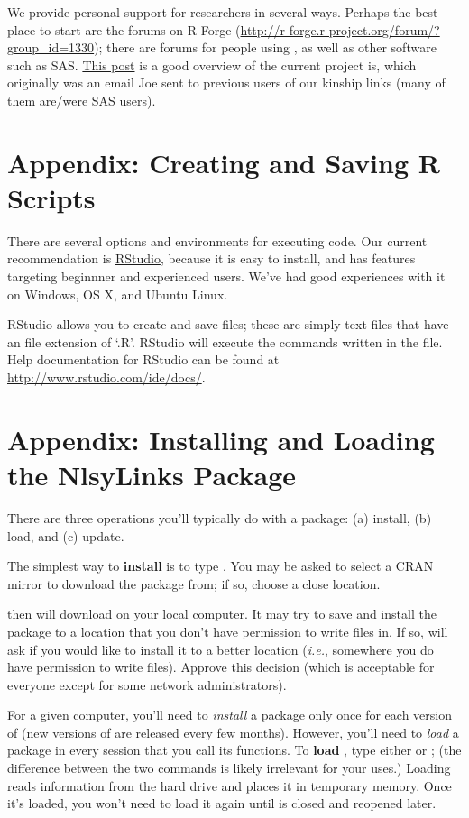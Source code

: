 \documentclass[letterpaper]{article}\usepackage{graphicx, color}
\begin{document}
We provide personal support for researchers in several ways.  Perhaps the best
place to start are the forums on R-Forge
(\url{http://r-forge.r-project.org/forum/?group_id=1330}); there are forums for
people using \R{}, as well as other software such as SAS.  \href{https://r-forge.r-project.org/forum/forum.php?thread_id=4537&forum_id=4266&group_id=1330}{This
post} is a good overview of the current project is, which originally was an
email Joe sent to previous users of our kinship links (many of them are/were SAS
users).

\section{Appendix: Creating and Saving R Scripts}
\label{sec:RScripts} There are several options and environments for executing \R{} code.  Our current
recommendation is \href{http://rstudio.org/}{RStudio}, because it is easy to
install, and has features targeting beginnner and experienced \R{} users. 
We've had good experiences with it on Windows, OS X, and Ubuntu Linux.

RStudio allows you to create and save \R{} files; these are simply text files
that have an file extension of `.R'.  RStudio will execute the commands written
in the file.  Help documentation for RStudio can be found at
\url{http://www.rstudio.com/ide/docs/}.

\section{Appendix: Installing and Loading the NlsyLinks Package} \label{sec:InstallingPackage}
There are three operations you'll typically do with a package: (a) install, (b) load, and (c) update.

The simplest way to \textbf{install}  is to type
.  You may be asked to select a CRAN
mirror to download the package from; if so, choose a close location.

\R{} then will download  on your local computer.  It may
try to save and install the package to a location that you don't have permission to
write files in.  If so, \R{} will ask if you would like to install it to a
better location (\emph{i.e.}, somewhere you do have permission to write files). 
Approve this decision (which is acceptable for everyone except for some network
administrators).

For a given computer, you'll need to \emph{install} a package only once for each
version of \R{} (new versions of \R{} are released every few months).  However, you'll need to \emph{load} a package in
every session that you call its functions.  To \textbf{load} ,
type either  or ; (the
difference between the two commands is likely irrelevant for your uses.) 
Loading reads  information from the hard drive and places it in
temporary memory.  Once it's loaded, you won't need to load it again until \R{}
is closed and reopened later.
\end{document}
